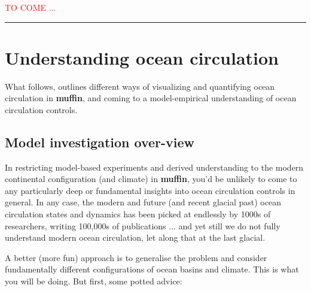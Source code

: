 \documentclass[11pt,fleqn]{book} %
\begin{document}
\noindent\textcolor{red}{TO COME ...}

\vspace{1mm}
\noindent\rule{4cm}{0.5pt}
\vspace{2mm}


\newpage

%
\section{Understanding ocean circulation}


What follows, outlines different ways of visualizing and quantifying ocean circulation in \textbf{muffin}, and coming to a model-empirical understanding of ocean circulation controls.


\subsection{Model investigation over-view}

In restricting model-based experiments and derived understanding to   the modern continental configuration (and climate) in \textbf{muffin}, you'd be unlikely to come to any particularly deep or fundamental insights into ocean circulation controls in general. In any case, the modern and future (and recent glacial past) ocean circulation states and dynamics has been picked at endlessly by 1000s of researchers, writing 100,000s of  publications ... and yet still we do not fully understand modern ocean circulation, let along that at the last glacial.

A better (more fun) approach is to generalise the problem and consider fundamentally different configurations of ocean basins and climate. This is what you will be doing. But first, some potted advice:
\end{document}
